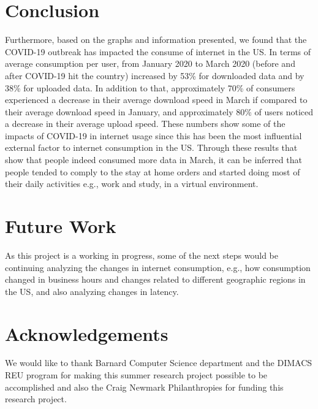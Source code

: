 \documentclass[conference,10pt]{IEEEtran}
\begin{document}
\section{Conclusion}
\label{sec:conclusion}




Furthermore, based on the graphs and information presented, we found that the COVID-19 outbreak has impacted the consume of internet in the US. In terms of average consumption per user, from January 2020 to March 2020 (before and after COVID-19 hit the country) increased by 53\% for downloaded data and by 38\% for uploaded data. In addition to that, approximately 70\% of consumers experienced a decrease in their average download speed in March if compared to their average download speed in January, and approximately 80\% of users noticed a decrease in their average upload speed. These numbers show some of the impacts of COVID-19 in internet usage since this has been the most influential external factor to internet consumption in the US. Through these results that show that people indeed consumed more data in March, it can be inferred that people tended to comply to the stay at home orders and started doing most of their daily activities e.g., work and study, in a virtual environment.

\section{Future Work}
\label{sec:future-work}

As this project is a working in progress, some of the next steps would be continuing analyzing the changes in internet consumption, e.g., how consumption changed in business hours and changes related to different geographic regions in the US, and also analyzing changes in latency.

\section{Acknowledgements}
\label{sec:acknowledgements}

We would like to thank Barnard Computer Science department and the DIMACS REU program for making this summer research project possible to be accomplished and also the Craig Newmark Philanthropies for funding this research project.



\end{document}
